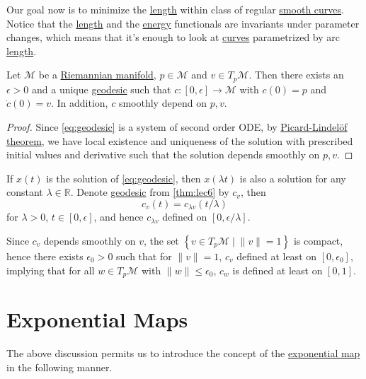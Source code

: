 Our goal now is to minimize the \hyperref[def:length]{length} within class of regular \hyperref[def:curve]{smooth curves}. Notice that the \hyperref[def:length]{length} and the \hyperref[def:energy]{energy} functionals are invariants under parameter changes, which means that it's enough to look at \hyperref[def:curve]{curves} parametrized by arc \hyperref[def:length]{length}.

\begin{theorem}\label{thm:lec6}
	Let \(\mathcal{M} \) be a \hyperref[def:Riemannian-manifold]{Riemannian manifold}, \(p\in \mathcal{M} \) and \(v\in T_p \mathcal{M} \). Then there exists an \(\epsilon > 0\) and a unique \hyperref[def:geodesic]{geodesic} such that \(c\colon [0, \epsilon ] \to  \mathcal{M} \) with \(c(0) = p\) and \(\dot{c}(0) = v\). In addition, \(c\) smoothly depend on \(p, v\).
\end{theorem}
\begin{proof}
	Since \autoref{eq:geodesic} is a system of second order ODE, by \href{https://en.wikipedia.org/wiki/Picard%E2%80%93Lindel%C3%B6f_theorem}{Picard-Lindelöf theorem}, we have local existence and uniqueness of the solution with prescribed initial values and derivative such that the solution depends smoothly on \(p, v\).
\end{proof}

If \(x(t)\) is the solution of \autoref{eq:geodesic}, then \(x(\lambda t)\) is also a solution for any constant \(\lambda \in \mathbb{R} \). Denote \hyperref[def:geodesic]{geodesic} from \autoref{thm:lec6} by \(c_v\), then
\[
	c_v(t) = c_{\lambda v}(t / \lambda )
\]
for \(\lambda > 0\), \(t\in [0, \epsilon ]\), and hence \(c_{\lambda v}\) defined on \([0, \epsilon / \lambda ]\).

\begin{remark}
	Since \(c_v\) depends smoothly on \(v\), the set \(\left\{ v\in T_p \mathcal{M} \mid \lVert v \rVert = 1 \right\} \) is compact, hence there exists \(\epsilon _0 > 0\) such that for \(\lVert v \rVert = 1\), \(c_v\) defined at least on \([0, \epsilon _0]\), implying that for all \(w\in T_p \mathcal{M} \) with \(\lVert w \rVert \leq \epsilon _0\), \(c_w\) is defined at least on \([0, 1]\).
\end{remark}

\section{Exponential Maps}
The above discussion permits us to introduce the concept of the \hyperref[def:exponential-map]{exponential map} in the following manner.


